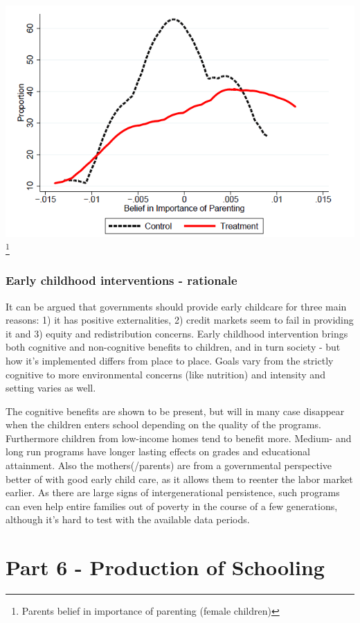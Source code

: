 \documentclass[12pt, a4paper]{article}
\begin{document}
\begin{multicols}{2}
\includegraphics[width = 0.5 \textwidth]{perry1.PNG}\footnote{Parents belief in importance of parenting (female children)}

\subsubsection{Early childhood interventions - rationale}
It can be argued that governments should provide early childcare for three main reasons: 1) it has positive externalities, 2) credit markets seem to fail in providing it and 3) equity and redistribution concerns. Early childhood intervention brings both cognitive and non-cognitive benefits to children, and in turn society - but how it's implemented differs from place to place. Goals vary from the strictly cognitive to more environmental concerns (like nutrition) and intensity and setting varies as well.

The cognitive benefits are shown to be present, but will in many case disappear when the children enters school depending on the quality of the programs. Furthermore children from low-income homes tend to benefit more. Medium- and long run programs have longer lasting effects on grades and educational attainment. Also the mothers(/parents) are from a governmental perspective better of with good early child care, as it allows them to reenter the labor market earlier. As there are large signs of intergenerational persistence, such programs can even help entire families out of poverty in the course of a few generations, although it's hard to test with the available data periods.

\section{Part 6 - Production of Schooling}

\end{multicols}
\end{document}

